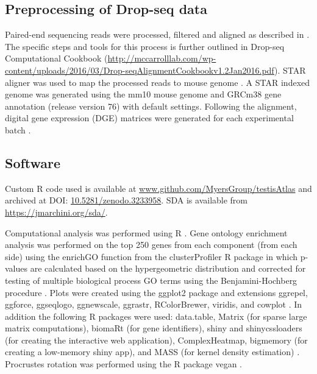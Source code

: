 \subsection{Preprocessing of Drop-seq data}

Paired-end sequencing reads were processed, filtered and aligned as described in \cite{Macosko2015Highly}.
The specific steps and tools for this process is further outlined in Drop-seq Computational Cookbook (\url{http://mccarrolllab.com/wp-content/uploads/2016/03/Drop-seqAlignmentCookbookv1.2Jan2016.pdf}).
STAR aligner was used to map the processed reads to mouse genome \parencite{Dobin2013STAR}.
A STAR indexed genome was generated using the mm10 mouse genome and GRCm38 gene annotation (release version 76) with default settings.
Following the alignment, digital gene expression (DGE) matrices were generated for each experimental batch \parencite{Macosko2015Highly}.

\subsection{Software}
Custom R code used is available at \url{www.github.com/MyersGroup/testisAtlas} and archived at DOI: \href{http://www.doi.org/10.5281/zenodo.3233958}{10.5281/zenodo.3233958}.
SDA is available from \url{https://jmarchini.org/sda/}.

Computational analysis was performed using R \parencite{RCoreTeam2018Language}.
Gene ontology enrichment analysis was performed on the top 250 genes from each component (from each side) using the enrichGO function from the clusterProfiler R package in which p-values are calculated based on the hypergeometric distribution and corrected for testing of multiple biological process GO terms using the Benjamini-Hochberg procedure \parencite{Yu2012clusterProfiler}.
Plots were created using the ggplot2 package and extensions ggrepel, ggforce, ggseqlogo, ggnewscale, ggrastr, RColorBrewer, viridis, and cowplot \parencite{Campitelli2019ggnewscale, Garnier2018viridis, Neuwirth2014RColorBrewer, Pedersen2016ggforce, Petukhov2018ggrastr, Wagih2017ggseqlogo, Wickham2016ggplot2, Wilke2018cowplot}.
In addition the following R packages were used: data.table, Matrix (for sparse large matrix computations), biomaRt (for gene identifiers), shiny and shinycssloaders (for creating the interactive web application), ComplexHeatmap, bigmemory (for creating a low-memory shiny app), and MASS (for kernel density estimation) \parencite{Bates2018Matrix, Chang2018shiny, Dowle2019data, Durinck2005BioMart, Gu2016Complex, Kane2013Scalable, Sali2017shinycssloaders, Venables2002Modern}.
Procrustes rotation was performed using the R package vegan \parencite{Lin2019NNLM, Oksanen2019vegan}.

